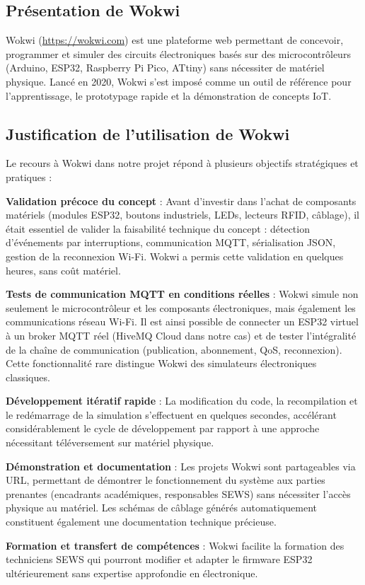 \subsection{Présentation de Wokwi}

Wokwi (\url{https://wokwi.com}) est une plateforme web permettant de concevoir, programmer et simuler des circuits électroniques basés sur des microcontrôleurs (Arduino, ESP32, Raspberry Pi Pico, ATtiny) sans nécessiter de matériel physique. Lancé en 2020, Wokwi s'est imposé comme un outil de référence pour l'apprentissage, le prototypage rapide et la démonstration de concepts IoT.

\subsection{Justification de l'utilisation de Wokwi}

Le recours à Wokwi dans notre projet répond à plusieurs objectifs stratégiques et pratiques :

\textbf{Validation précoce du concept} : Avant d'investir dans l'achat de composants matériels (modules ESP32, boutons industriels, LEDs, lecteurs RFID, câblage), il était essentiel de valider la faisabilité technique du concept : détection d'événements par interruptions, communication MQTT, sérialisation JSON, gestion de la reconnexion Wi-Fi. Wokwi a permis cette validation en quelques heures, sans coût matériel.

\textbf{Tests de communication MQTT en conditions réelles} : Wokwi simule non seulement le microcontrôleur et les composants électroniques, mais également les communications réseau Wi-Fi. Il est ainsi possible de connecter un ESP32 virtuel à un broker MQTT réel (HiveMQ Cloud dans notre cas) et de tester l'intégralité de la chaîne de communication (publication, abonnement, QoS, reconnexion). Cette fonctionnalité rare distingue Wokwi des simulateurs électroniques classiques.

\textbf{Développement itératif rapide} : La modification du code, la recompilation et le redémarrage de la simulation s'effectuent en quelques secondes, accélérant considérablement le cycle de développement par rapport à une approche nécessitant téléversement sur matériel physique.

\textbf{Démonstration et documentation} : Les projets Wokwi sont partageables via URL, permettant de démontrer le fonctionnement du système aux parties prenantes (encadrants académiques, responsables SEWS) sans nécessiter l'accès physique au matériel. Les schémas de câblage générés automatiquement constituent également une documentation technique précieuse.

\textbf{Formation et transfert de compétences} : Wokwi facilite la formation des techniciens SEWS qui pourront modifier et adapter le firmware ESP32 ultérieurement sans expertise approfondie en électronique.

